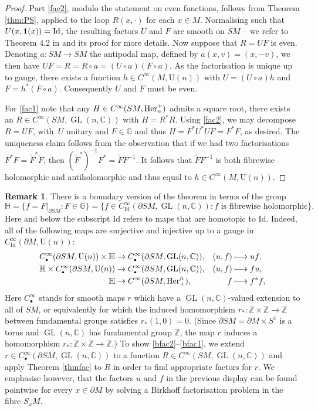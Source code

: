 \documentclass[JEP,XML,SOM,Unicode,published]{cedram}
\newcommand\mto{\mathchoice{\longmapsto}{\mapsto}{\mapsto}{\mapsto}}
\DeclareMathOperator{\GL}{GL}
\newcommand{\rU}{\mathrm{U}}
\theoremstyle{plain}
\theoremstyle{definition}
\newtheorem{remark}[theorem]{Remark}
\newcommand{\G}{\mathbb{G}}
\newcommand{\Z}{\mathbb{Z}}
\newcommand{\C}{\mathbb{C}}
\newcommand{\HH}{\mathbb{H}}
\newcommand{\he}{\textup{Her}}
\newcommand{\Id}{\mathrm{Id}}
\newcommand{\1}{{\bf 1}}
\newcommand{\extend}{{\scriptscriptstyle\bullet}}
\begin{document}
\begin{proof}
Part \eqref{fac2}, modulo the statement on even functions, follows from Theorem \ref{thm:PS}, applied to the loop $R(x,\cdot)$ for each $x\in M$.
Normalising such that $U(x,\1(x))=\Id$, the resulting factors $U$ and $F$ are smooth on $SM$ -- we refer to Theorem 4.2 in \cite{PaSa20} and its proof for more details. Now suppose that $R=UF$ is even. Denoting $a:SM\to SM$ the antipodal map, defined by $a(x,v)=(x,-v)$, we then have $UF = R = R\circ a= (U\circ a)(F\circ a)$. As the factorisation is unique up to gauge, there exists a function $h\in C^\infty(M,\rU(n))$ with $U=(U\circ a)h$ and $F=h^*(F\circ a)$. Consequently $U$ and $F$ must be even.

For \eqref{fac1} note that any $H\in C^\infty(SM,\he^+_n)$ admits a square root, \ie there exists an $R\in C^\infty(SM,\GL(n,\C))$ with $H=R^*R$. Using \eqref{fac2}, we may decompose $R=UF$, with~$U$ unitary and $F\in \G$ and thus $H=F^*U^*UF=F^*F$, as desired. The uniqueness claim follows from the observation that if we had two factorisations $F^*F=\tilde{F}^*\tilde{F}$, then $(\tilde{F}^*)^{-1}F^*=\tilde{F}F^{-1}$. It follows that $\tilde{F}F^{-1}$ is both fibrewise holomorphic and antiholomorphic and thus equal to $h\in C^{\infty}(M,\rU(n))$.
\end{proof}

\begin{remark}\label{boundaryfac}
There is a boundary version of the theorem in terms of the group
\[
\mathbb{H}=\{f=F\vert_{\partial SM}: F\!\in\! \G\} = \{f\!\in\! C_\Id^\infty(\partial SM,\GL(n,\C)): f\text{ is fibrewise holomorphic}\}.
\]
Here and below the subscript $\Id$
refers to maps that are homotopic to $\Id$. Indeed, all of the following maps are surjective and injective up to a gauge in $C^\infty_\Id(\partial M,\rU(n))$:
\begin{align}
C^\infty_\extend (\partial SM,\rU(n))\times \HH &\to C^\infty_\extend(\partial SM,\GL(n,\C)),& (u,f)&\mto uf,\label{bfac2} \\
\HH\times C^\infty_\extend(\partial SM,\rU(n)) &\to C^\infty_\extend(\partial SM,\GL(n,\C)),& (u,f)&\mto fu, \label{bfac3}\\
\HH &\to C^\infty(\partial SM,\he_+^n),& f&\mto f^*f, \label{bfac1}
\end{align}
Here $C_\extend^\infty$ stands for smooth maps $r$ which have a $\GL(n,\C)$-valued extension to all of $SM$, or equivalently for which the induced homomorphism $r_*:\Z\times \Z\to \Z$ between fundamental groups satisfies $r_*(1,0)=0$.
(Since $\partial SM=\partial M\times S^{1}$ is a torus and $\GL(n,\C)$ has fundamental group $\mathbb{Z}$,
the map $r$ induces a homomorphism \hbox{$r_{*}:\mathbb{Z}\times\mathbb{Z}\to \mathbb{Z}$}.)
To show \eqref{bfac2}--\eqref{bfac1}, we extend $r\in C_\extend^\infty(\partial SM,\GL(n,\C))$ to a function $R\in C^\infty(SM,\GL(n,\C))$ and apply Theorem \ref{thmfac} to $R$ in order to find appropriate factors for $r$. We emphasise however, that the factors $u$ and $f$ in the previous display can be found pointwise for every $x\in \partial M$ by solving a Birkhoff factorisation problem in the fibre $S_xM$.
\end{remark}
\end{document}
